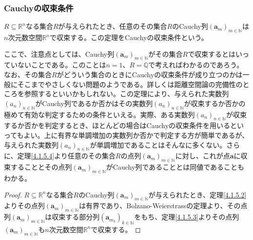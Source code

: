 \documentclass[dvipdfmx]{jsarticle}
\begin{document}
\subsubsection{Cauchyの収束条件}%
\begin{thm}[Cauchyの収束条件]\label{4.1.5.10}
$R \subseteq \mathbb{R}^{n}$なる集合$R$が与えられたとき、任意のその集合$R$のCauchy列$\left( \mathbf{a}_{m} \right)_{m \in \mathbb{N}}$は$n$次元数空間$\mathbb{R}^{n}$で収束する。この定理をCauchyの収束条件という。
\end{thm}\par
ここで、注意点としては、Cauchy列$\left( \mathbf{a}_{m} \right)_{m \in \mathbb{N}}$がその集合$R$で収束するとはいっていないことである。このことは$n = 1$、$R = \mathbb{Q}$で考えればわかるのであろう。なお、その集合$R$がどういう集合のときにCauchyの収束条件が成り立つのかは一般にそこまでやさしくない問題のようである。詳しくは距離空間論の完備性のところを参照するといいかもしれない。この定理により、与えられた実数列$\left( a_{n} \right)_{n \in \mathbb{N}}$がCauchy列であるか否かはその実数列$\left( a_{n} \right)_{n \in \mathbb{N}}$が収束するか否かの極めて有効な判定するための条件といえる。実際、ある実数列$\left( a_{n} \right)_{n \in \mathbb{N}}$が収束するか否かを判定するとき、ほとんどの場合はCauchyの収束条件を用いるといってもよい。上に有界な単調増加の実数列か否かで判定する方が簡単であるが、与えられた実数列$\left( a_{n} \right)_{n \in \mathbb{N}}$が単調増加であることはそんなに多くない。さらに、定理\ref{4.1.5.4}より任意のその集合$R$の点列$\left( \mathbf{a}_{m} \right)_{m \in \mathbb{N}}$に対し、これが点$\mathbf{a}$に収束することとその点列$\left( \mathbf{a}_{m} \right)_{m \in \mathbb{N}}$がCauchy列であることとは同値であることもわかる。
\begin{proof}
$R \subseteq \mathbb{R}^{n}$なる集合$R$のCauchy列$\left( \mathbf{a}_{m} \right)_{m \in \mathbb{N}}$が与えられたとき、定理\ref{4.1.5.2}よりその点列$\left( \mathbf{a}_{m} \right)_{m \in \mathbb{N}}$は有界であり、Bolzano-Weierstrassの定理より、その点列$\left( \mathbf{a}_{m} \right)_{m \in \mathbb{N}}$は収束する部分列$\left( \mathbf{a}_{m_{k}} \right)_{k \in \mathbb{N}}$をもち、定理\ref{4.1.5.3}よりその点列$\left( \mathbf{a}_{m} \right)_{m \in \mathbb{N}}$も$n$次元数空間$\mathbb{R}^{n}$で収束する。
\end{proof}
\end{document}
